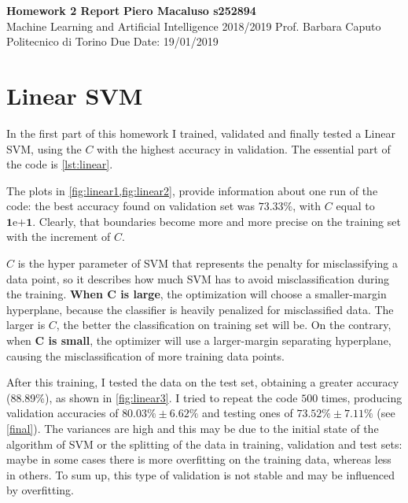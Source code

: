 \documentclass[a4paper, 11pt]{article}
\begin{document}
	\noindent
	\large\textbf{Homework 2 Report} \hfill \textbf{Piero Macaluso s252894} \\
	\normalsize Machine Learning and Artificial Intelligence 2018/2019 \hfill Prof. Barbara Caputo  \\
	\normalsize Politecnico di Torino \hfill Due Date: 19/01/2019 
	
	\section{Linear SVM} \label{linearsvm}
	
	In the first part of this homework I trained, validated and finally tested a Linear SVM, using the $C$ with the highest accuracy in validation. The essential part of the code is \vref{lst:linear}.
	
	
%	
%	
	
	The plots in \vref{fig:linear1,fig:linear2}, provide information about one run of the code: the best accuracy found on validation set was $73.33\%$, with $C$ equal to  $\boldsymbol{1\mathrm{e}{+1}}$. Clearly, that boundaries become more and more precise on the training set with the increment of $C$. 
	
	$C$ is the hyper parameter of SVM that represents the penalty for misclassifying a data point, so it describes how much SVM has to avoid misclassification during the training.
	\textbf{When $\boldsymbol{C}$ is large}, the optimization will choose a smaller-margin hyperplane, because the classifier is heavily penalized for misclassified data.
	The larger is $C$, the better the classification on training set will be. On the contrary, when \textbf{$\boldsymbol{C}$ is small}, the optimizer will use a larger-margin separating hyperplane, causing the misclassification of more training data points.
	
	After this training, I tested the data on the test set, obtaining a greater accuracy (88.89\%), as shown in \vref{fig:linear3}.  I tried to repeat the code $500$ times, producing validation accuracies of $\boldsymbol{80.03\%\pm6.62\%}$ and testing ones of $\boldsymbol{73.52\%\pm7.11\%}$ (see \vref{final}). The variances are high and this may be due to the initial state of the algorithm of SVM or the splitting of the data in training, validation and test sets: maybe in some cases there is more overfitting on the training data, whereas less in others. To sum up, this type of validation is not stable and may be influenced by overfitting.
\end{document}
